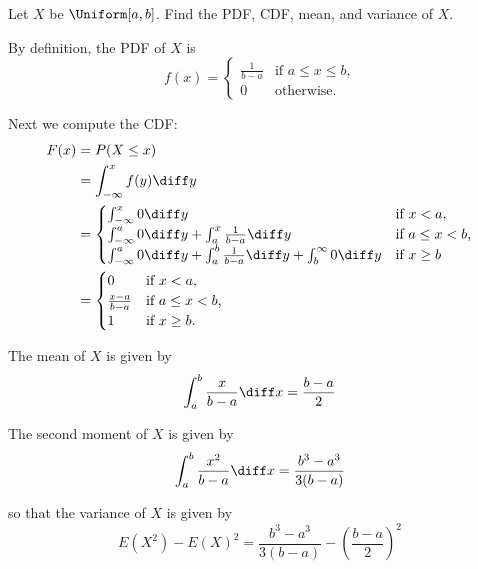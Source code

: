 \begin{problem}[Handout 12, \# 2]
  Let \(X\) be \(\Uniform[a,b]\). Find the PDF, CDF, mean, and variance of
  \(X\).
\end{problem}
\begin{solution}
  By definition, the PDF of \(X\) is
  \[
    f(x)=
    \begin{cases}
      \frac{1}{b-a}&\text{if \(a\leq x\leq b\),}\\
      0&\text{otherwise.}
    \end{cases}
  \]

  Next we compute the CDF:
  \begin{align*}
    F(x)&=P(X\leq x)\\
        &=\int_{-\infty}^x f(y)\diff y\\
        &=\begin{cases}
          \int_{-\infty}^x 0\diff y&\text{if \(x<a\),}\\
          \int_{-\infty}^a 0\diff y%
          +\int_a^x\frac{1}{b-a}\diff y&\text{if \(a\leq x<b\),}\\
          \int_{-\infty}^a 0\diff y%
          +\int_a^b\frac{1}{b-a}\diff y%
          +\int_b^\infty 0\diff y&\text{if \(x\geq b\)}
          \end{cases}\\
        &=\begin{cases}
          0&\text{if \(x<a\),}\\
          \frac{x-a}{b-a}&\text{if \(a\leq x<b\),}\\
          1&\text{if \(x\geq b\).}
        \end{cases}
  \end{align*}

  The mean of $X$ is given by
  \[
    \int_a^b \frac{x}{b-a} \diff x = \frac{b-a}{2}
  \]

  The second moment of $X$ is given by
  \[
    \int_a^b \frac{x^2}{b-a} \diff x = \frac{b^3-a^3}{3(b-a)}
  \]

  so that the variance of $X$ is given by
  \[
    E(X^2) - E(X)^2 = \frac{b^3-a^3}{3(b-a)} - \left(\frac{b-a}{2}\right)^2
  \]


\end{solution}
\newpage

